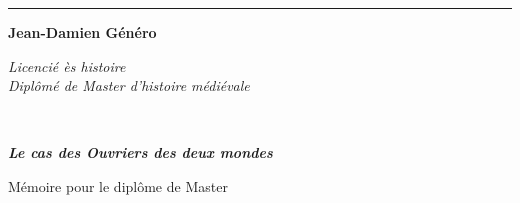 \begin{titlepage}
\begin{center}

\bigskip

\begin{large}
\end{large}
\begin{center}\rule{2cm}{0.02cm}\end{center}

\bigskip
\bigskip
\bigskip
\begin{Large}
\textbf{Jean-Damien Généro}\\
\end{Large}
\begin{normalsize} \textit{Licencié ès histoire}\\
\textit{Diplômé de Master d'histoire médiévale}\\
\end{normalsize}

\bigskip
\bigskip
\bigskip

\begin{Huge}
\textbf{}\\
\end{Huge}
\bigskip
\bigskip
\begin{LARGE}
\textbf{\emph{Le cas des Ouvriers des deux mondes} }\\
\end{LARGE}

\bigskip
\bigskip
\bigskip
\begin{large}
\end{large}
\vfill

\begin{large}
Mémoire 
pour le diplôme de Master \\
\tnah \\
\end{large}

\end{center}
\end{titlepage}